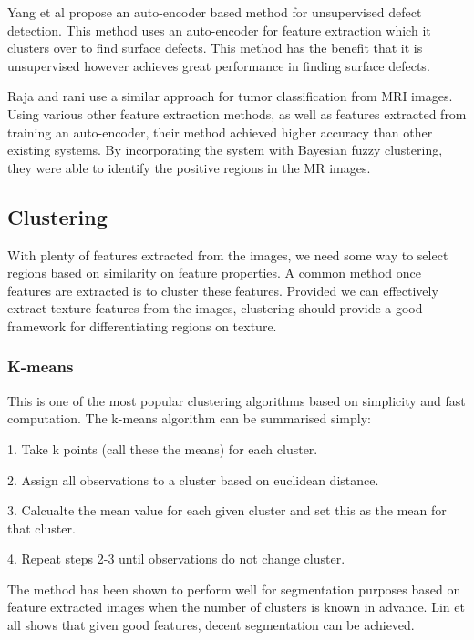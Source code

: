 \documentclass[a4]{article}
\begin{document}
  

Yang et al \cite{yang2019multiscale} propose an auto-encoder based method for unsupervised defect detection. This method uses an auto-encoder for feature extraction which it clusters over to find surface defects. This method has the benefit that it is unsupervised however achieves great performance in finding surface defects. 

  

Raja and rani \cite{siva2020brain} use a similar approach for tumor classification from MRI images. Using various other feature extraction methods, as well as features extracted from training an auto-encoder, their method achieved higher accuracy than other existing systems. By incorporating the system with Bayesian fuzzy clustering, they were able to identify the positive regions in the MR images. 

\subsection*{Clustering}

With plenty of features extracted from the images, we need some way to select regions based on similarity on feature properties. A common method once features are extracted is to cluster these features. Provided we can effectively extract texture features from the images, clustering should provide a good framework for differentiating regions on texture. 

\subsubsection*{K-means}

This is one of the most popular clustering algorithms based on simplicity and fast computation. The k-means algorithm can be summarised simply: 

  

1. Take k points (call these the means) for each cluster. 

2. Assign all observations to a cluster based on euclidean distance. 

3. Calcualte the mean value for each given cluster and set this as the mean for that cluster. 

4. Repeat steps 2-3 until observations do not change cluster. 

  

The method has been shown to perform well for segmentation purposes based on feature extracted images when the number of clusters is known in advance. Lin et all \cite{lin2010image} shows that given good features, decent segmentation can be achieved. 
\end{document}
